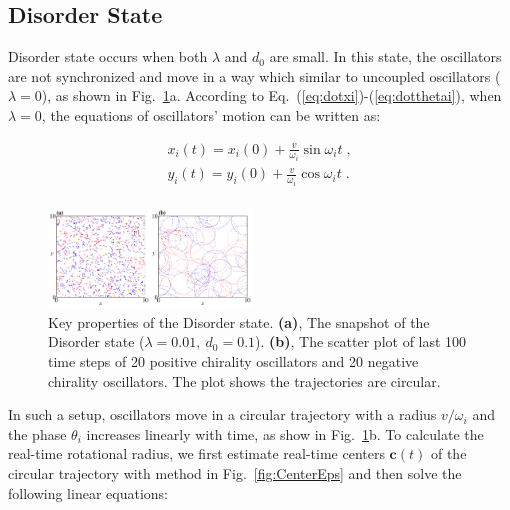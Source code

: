 \documentclass[%
 aip,
 amsmath,amssymb,
 reprint,%
]{revtex4-1}
\begin{document}
\subsection{Disorder State}

Disorder state occurs when both $\lambda$ and $d_0$ are small. In this state, the oscillators are not synchronized and move in a way which similar to uncoupled oscillators ($\lambda=0$), as shown in Fig.~\ref{fig:disorderState}a. According to Eq.~(\ref{eq:dotxi})-(\ref{eq:dotthetai}), when $\lambda=0$, the equations of oscillators' motion can be written as:

\begin{equation}
    \begin{array}{c}
        x_i\left( t \right) =x_i\left( 0 \right) +\frac{v}{\omega _i}\sin \omega _it\;,\\
        y_i\left( t \right) =y_i\left( 0 \right) +\frac{v}{\omega _i}\cos \omega _it\;.\\
    \end{array}
\end{equation}

\begin{figure}
    \includegraphics[width=0.48\textwidth]{./figs/disorderState.pdf}
    \caption{
        \label{fig:disorderState} Key properties of the Disorder state. 
        \textbf{(a)}, The snapshot of the Disorder state ($\lambda=0.01,\ d_0=0.1$). 
        \textbf{(b)}, The scatter plot of last 100 time steps of 20 positive chirality oscillators and 20 negative chirality oscillators. The plot shows the trajectories are circular.
    }
\end{figure}

In such a setup, oscillators move in a circular trajectory with a radius $v/\omega _i$ and the phase $\theta_i$ increases linearly with time, as show in Fig.~\ref{fig:disorderState}b. To calculate the real-time rotational radius, we first estimate real-time centers $\mathbf{c}(t)
$ of the circular trajectory with method in Fig.~\ref{fig:CenterEps} and then solve the following linear equations:
\end{document}
